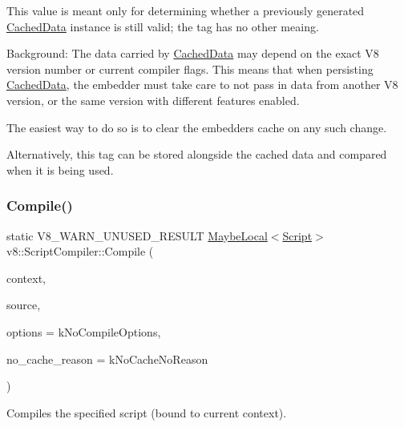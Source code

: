 This value is meant only for determining whether a previously generated \mbox{\hyperlink{structv8_1_1ScriptCompiler_1_1CachedData}{Cached\+Data}} instance is still valid; the tag has no other meaing.

Background\+: The data carried by \mbox{\hyperlink{structv8_1_1ScriptCompiler_1_1CachedData}{Cached\+Data}} may depend on the exact V8 version number or current compiler flags. This means that when persisting \mbox{\hyperlink{structv8_1_1ScriptCompiler_1_1CachedData}{Cached\+Data}}, the embedder must take care to not pass in data from another V8 version, or the same version with different features enabled.

The easiest way to do so is to clear the embedder\textquotesingle{}s cache on any such change.

Alternatively, this tag can be stored alongside the cached data and compared when it is being used. \mbox{\label{classv8_1_1ScriptCompiler_a217bcf520f4ed70f6f02afeabfe60319}} 
\subsubsection{\texorpdfstring{Compile()}{Compile()}\hspace{0.1cm}{\footnotesize\ttfamily [1/2]}}
{\footnotesize\ttfamily static V8\+\_\+\+W\+A\+R\+N\+\_\+\+U\+N\+U\+S\+E\+D\+\_\+\+R\+E\+S\+U\+LT \mbox{\hyperlink{classv8_1_1MaybeLocal}{Maybe\+Local}}$<$\mbox{\hyperlink{classv8_1_1Script}{Script}}$>$ v8\+::\+Script\+Compiler\+::\+Compile (\begin{DoxyParamCaption}\item[{\mbox{\hyperlink{classv8_1_1Local}{Local}}$<$ Context $>$}]{context,  }\item[{\mbox{\hyperlink{classv8_1_1ScriptCompiler_1_1Source}{Source}} $\ast$}]{source,  }\item[{Compile\+Options}]{options = {\ttfamily kNoCompileOptions},  }\item[{\mbox{\hyperlink{classv8_1_1ScriptCompiler_a7f13fa15484cfc500ae51927756e0d60}{No\+Cache\+Reason}}}]{no\+\_\+cache\+\_\+reason = {\ttfamily kNoCacheNoReason} }\end{DoxyParamCaption})\hspace{0.3cm}{\ttfamily [static]}}

Compiles the specified script (bound to current context).


